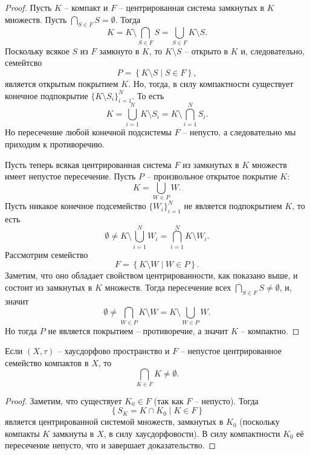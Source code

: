 \begin{proof}
    Пусть $K$ -- компакт и $F$ -- центрированная система замкнутых в $K$ множеств.
    Пусть $\bigcap_{S \in F} S = \emptyset$.
    Тогда
    \[
        K = K \setminus \bigcap_{S \in F} S = \bigcup_{S \in F} K \setminus S.
    \]
    Поскольку всякое $S$ из $F$ замкнуто в $K$, то $K \setminus S$ -- открыто в $K$ и, следовательно, семейтсво
    \[
        P = \left\{K \setminus S \mid S \in F\right\},
    \]
    является открытым покрытием $K$.
    Но, тогда, в силу компактности существует конечное подпокрытие $\{K \setminus S_i\}_{i = 1}^{N}$.
    То есть
    \[
        K = \bigcup_{i = 1}^{N} K \setminus S_i = K \setminus \bigcap_{i = 1}^{N} S_i.
    \]
    Но пересечение любой конечной подсистемы $F$ -- непусто, а следовательно мы приходим к противоречию.

    Пусть теперь всякая центрированная система $F$ из замкнутых в $K$ множеств имеет непустое пересечение.
    Пусть $P$ -- произвольное открытое покрытие $K$:
    \[
        K = \bigcup_{W \in P} W.
    \]
    Пусть никакое конечное подсемейство $\{W_i\}_{i = 1}^{N}$ не является подпокрытием $K$, то есть
    \[
        \emptyset \neq K \setminus \bigcup_{i = 1}^{N} W_i = \bigcap_{i = 1}^{N} K \setminus W_i.
    \]
    Рассмотрим семейство
    \[
        F = \left\{ K \setminus W \mid W \in P \right\}.
    \]
    Заметим, что оно обладает свойством центрированности, как показано выше, и состоит из замкнутых в $K$ множеств.
    Тогда пересечение всех $\bigcap_{S \in F} S \neq \emptyset$, и, значит
    \[
        \emptyset \neq \bigcap_{W \in P} K \setminus W = K \setminus \bigcup_{W \in P} W.
    \]
    Но тогда $P$ не является покрытием -- противоречие, а значит $K$ -- компактно.
\end{proof}
\begin{corollary}
    Если $(X, \tau)$ -- хаусдорфово пространство и $F$ -- непустое центрированное семейство компактов в $X$, то
    \[
        \bigcap_{K \in F} K \neq \emptyset.
    \]
\end{corollary}
\begin{proof}
    Заметим, что существует $K_0 \in F$ (так как $F$ -- непусто).
    Тогда
    \[
        \left\{S_K = K \cap K_0 \mid K \in F\right\}
    \]
    является центрированной системой множеств, замкнутых в $K_0$ (поскольку компакты $K$ замкнуты в $X$, в силу хаусдорфовости).
    В силу компактности $K_0$ её пересечение непусто, что и завершает доказательство.
\end{proof}
